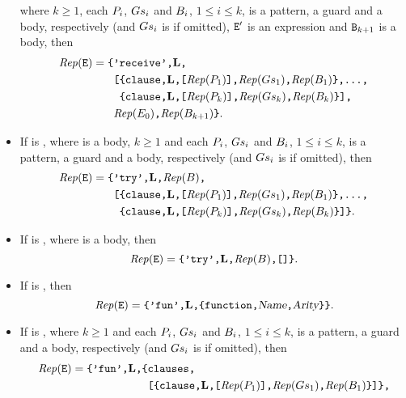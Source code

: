 \begin{itemize}
where $k\geq1$, each ${\sl P}_i$, ${\sl Gs}_i$ and ${\sl B}_i$, $1\leq i\leq k$,
is a pattern, a guard and a body, respectively (and ${\sl Gs}_i$ is  if
omitted), ${\tt{\sl E}}'$ is an expression and ${\tt{\sl B}}_{k+1}$ is a body, then
\begin{align*}
\Rep(\TZ{E}) =
\text{\T{\{}}&\text{\T{'receive',\LINE,}} \\
             &\text{\T{[\{clause,\LINE,[$\Rep(\Z{P}_1)$],$\Rep(\Z{Gs}_1)$,$\Rep(\Z{B}_1)$\},\tdots,}} \\
             &\text{\T{~\{clause,\LINE,[$\Rep(\Z{P}_k)$],$\Rep(\Z{Gs}_k)$,$\Rep(\Z{B}_k)$\}],}} \\
             &\text{\T{$\Rep(\Z{E}_0)$,$\Rep(\Z{B}_{k+1})$\}}.}
\end{align*}
\ifStd
\item If  is ,
where  is a body, $k\geq1$ and each ${\sl P}_i$, ${\sl Gs}_i$ and ${\sl B}_i$, $1\leq i\leq k$,
is a pattern, a guard and a body, respectively (and ${\sl Gs}_i$ is  if
omitted), then
\begin{align*}
\Rep(\TZ{E}) =
\text{\T{\{}}&\text{\T{'try',\LINE,$\Rep(\Z{B})$,}} \\
             &\text{\T{[\{clause,\LINE,[$\Rep(\Z{P}_1)$],$\Rep(\Z{Gs}_1)$,$\Rep(\Z{B}_1)$\},\tdots,}} \\
             &\text{\T{~\{clause,\LINE,[$\Rep(\Z{P}_k)$],$\Rep(\Z{Gs}_k)$,$\Rep(\Z{B}_k)$\}]\}}.}
\end{align*}
\item If  is ,
where  is a body, then
\[{\rm{\it Rep}}({\tt{\sl E}}) = \text{{\tt\{'try',{\rm{\bf L}},${\rm{\it Rep}}({\sl B})$,[]\}}}.\]
\fi
\item If  is , then
\[{\rm{\it Rep}}({\tt{\sl E}}) = \text{{\tt\{'fun',{\rm{\bf L}},\{function,{\sl Name},{\sl Arity}\}\}}}.\]
\item If  is ,
where $k\geq1$ and each ${\sl P}_i$, ${\sl Gs}_i$ and ${\sl B}_i$, $1\leq i\leq k$,
is a pattern, a guard and a body, respectively (and ${\sl Gs}_i$ is  if
omitted), then
\begin{align*}
\Rep(\TZ{E}) =
\text{\T{\{'fun',\LINE,\{}}&\text{\T{clauses,}} \\
                           &\text{\T{[\{clause,\LINE,[$\Rep(\Z{P}_1)$],$\Rep(\Z{Gs}_1)$,$\Rep(\Z{B}_1)$\}]\},}} \\

\end{align*}
\end{itemize}
